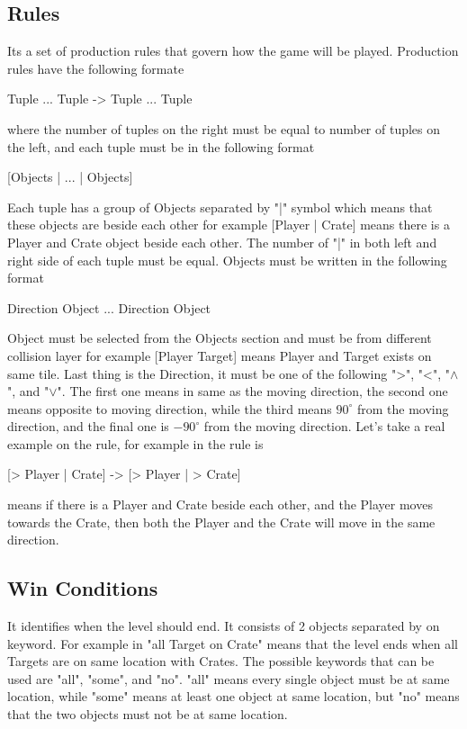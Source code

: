 \subsection{Rules}
Its a set of production rules that govern how the game will be played. Production rules have the following formate
\begin{center}{Tuple ... Tuple -> Tuple ... Tuple}\end{center}
where the number of tuples on the right must be equal to number of tuples on the left, and each tuple must be in the following format
\begin{center}{[Objects | ... | Objects]}\end{center}
Each tuple has a group of Objects separated by "|" symbol which means that these objects are beside each other for example [Player | Crate] means there is a Player and Crate object beside each other. The number of "|" in both left and right side of each tuple must be equal. Objects must be written in the following format
\begin{center}{Direction Object ... Direction Object}\end{center}
Object must be selected from the Objects section and must be from different collision layer for example [Player Target] means Player and Target exists on same tile. Last thing is the Direction, it must be one of the following ">", "<", "$\wedge$", and "$\vee$". The first one means in same as the moving direction, the second one means opposite to moving direction, while the third means $90^{\circ}$ from the moving direction, and the final one is $-90^{\circ}$ from the moving direction. Let's take a real example on the rule, for example in  the rule is
\begin{center}{[> Player | Crate] -> [> Player | > Crate]}\end{center}
means if there is a Player and Crate beside each other, and the Player moves towards the Crate, then both the Player and the Crate will move in the same direction.

\subsection{Win Conditions} 
It identifies when the level should end. It consists of 2 objects separated by on keyword. For example in  "all Target on Crate" means that the level ends when all Targets are on same location with Crates. The possible keywords that can be used are "all", "some", and "no". "all" means every single object must be at same location, while "some" means at least one object at same location, but "no" means that the two objects must not be at same location.

